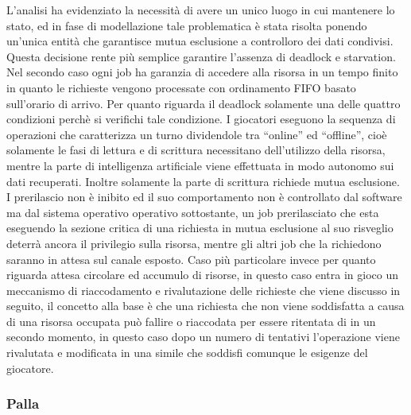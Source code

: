 L'analisi ha evidenziato la necessità di avere un unico luogo in cui mantenere lo stato, ed in fase di modellazione tale problematica è stata risolta ponendo un'unica entità che garantisce mutua esclusione a controlloro dei dati condivisi.\\

Questa decisione rente più semplice garantire l'assenza di deadlock e starvation. Nel secondo caso ogni job ha garanzia di accedere alla risorsa in un tempo finito in quanto le richieste vengono processate con ordinamento FIFO basato sull'orario di arrivo. Per quanto riguarda il deadlock solamente una delle quattro condizioni perchè si verifichi tale condizione. I giocatori eseguono la sequenza di operazioni che caratterizza un turno dividendole tra “online” ed “offline”, cioè solamente le fasi di lettura e di scrittura necessitano dell'utilizzo della risorsa, mentre la parte di intelligenza artificiale viene effettuata in modo autonomo sui dati recuperati. Inoltre solamente la parte di scrittura richiede mutua esclusione. I prerilascio non è inibito ed il suo comportamento non è controllato dal software ma dal sistema operativo operativo sottostante, un job prerilasciato che esta eseguendo la sezione critica di una richiesta in mutua esclusione al suo risveglio deterrà ancora il privilegio sulla risorsa, mentre gli altri job che la richiedono saranno in attesa sul canale esposto. Caso più particolare invece per quanto riguarda attesa circolare ed accumulo di risorse, in questo caso entra in gioco un meccanismo di riaccodamento e rivalutazione delle richieste che viene discusso in seguito, il concetto alla base è che una richiesta che non viene soddisfatta a causa di una risorsa occupata può fallire o riaccodata per essere ritentata di in un secondo momento, in questo caso dopo un numero di tentativi l'operazione viene rivalutata e modificata in una simile che soddisfi comunque le esigenze del giocatore.

\subsubsection{Palla}
\label{sec:analisi_concorrenza_palla}

